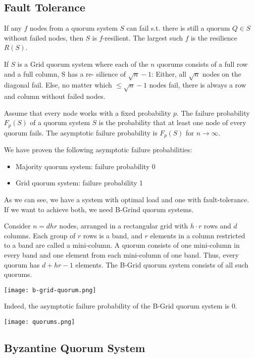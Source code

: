 \subsection{Fault Tolerance}

If any $f$ nodes from a quorum system $S$ can fail s.t. there is still a quorum $Q \in S$ without failed nodes, then $S$ is $f$-resilient. The largest such $f$ is the resilience $R(S)$. \medskip

If $S$ is a Grid quorum system where each of the $n$ quorums consists of a full row and a full column, S has a re- silience of $\sqrt n - 1$: Either, all $\sqrt n$ nodes on the diagonal fail. Else, no matter which $\leq \sqrt n - 1$ nodes fail, there is always a row and column without failed nodes. \medskip

Assume that every node works with a fixed probability $p$. The failure probability $F_p(S)$ of a quorum system $S$ is the probability that at least one node of every quorum fails. The asymptotic failure probability is $F_p(S)$ for $n \to \infty$. \medskip

We have proven the following asymptotic failure probabilities:
\begin{itemize}
	\item Majority quorum system: failure probability 0
	\item Grid quorum system: failure probability 1
\end{itemize}
As we can see, we have a system with optimal load and one with fault-tolerance. If we want to achieve both, we need B-Grind quorum systems. \medskip

Consider $n = dhr$ nodes, arranged in a rectangular grid with $h \cdot r$ rows and $d$ columns. Each group of $r$ rows is a band, and $r$ elements in a column restricted to a band are called a mini-column. A quorum consists of one mini-column in every band and one element from each mini-column of one band. Thus, every quorum has $d + hr - 1$ elements. The B-Grid quorum system consists of all such quorums.
\begin{center}
	\texttt{[image: b-grid-quorum.png]}
\end{center}

Indeed, the asymptotic failure probability of the B-Grid quorum system is 0.
\begin{center}
	\texttt{[image: quorums.png]}
\end{center}


\subsection{Byzantine Quorum System}

